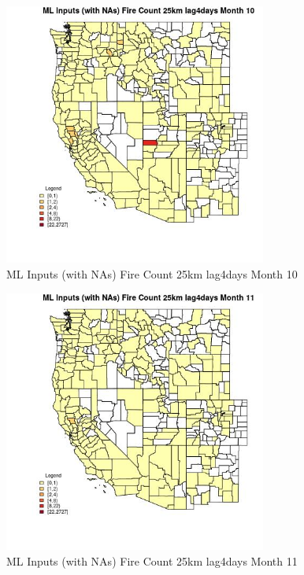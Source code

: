 \begin{figure} 
\centering  
\includegraphics[width=0.77\textwidth]{Code_Outputs/Report_ML_input_PM25_Step4_part_f_de_duplicated_aves_prioritize_24hr_obswNAs_CountyFire_Count_25km_lag4daysmedianMonth10.jpg} 
\caption{\label{fig:Report_ML_input_PM25_Step4_part_f_de_duplicated_aves_prioritize_24hr_obswNAsCountyFire_Count_25km_lag4daysmedianMonth10}ML Inputs (with NAs) Fire Count 25km lag4days Month 10} 
\end{figure} 
 

\begin{figure} 
\centering  
\includegraphics[width=0.77\textwidth]{Code_Outputs/Report_ML_input_PM25_Step4_part_f_de_duplicated_aves_prioritize_24hr_obswNAs_CountyFire_Count_25km_lag4daysmedianMonth11.jpg} 
\caption{\label{fig:Report_ML_input_PM25_Step4_part_f_de_duplicated_aves_prioritize_24hr_obswNAsCountyFire_Count_25km_lag4daysmedianMonth11}ML Inputs (with NAs) Fire Count 25km lag4days Month 11} 
\end{figure} 
 

